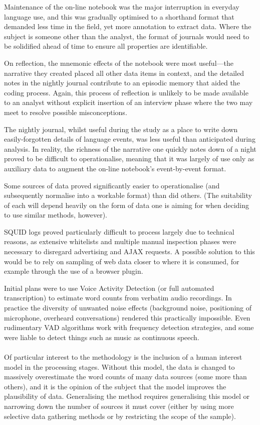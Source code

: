 Maintenance of the on-line notebook was the major interruption in everyday language use, and this was gradually optimised to a shorthand format that demanded less time in the field, yet more annotation to extract data.  Where the subject is someone other than the analyst, the format of journals would need to be solidified ahead of time to ensure all properties are identifiable.

On reflection, the mnemonic effects of the notebook were most useful---the narrative they created placed all other data items in context, and the detailed notes in the nightly journal contribute to an episodic memory that aided the coding process.  Again, this process of reflection is unlikely to be made available to an analyst without explicit insertion of an interview phase where the two may meet to resolve possible misconceptions.

The nightly journal, whilst useful during the study as a place to write down easily-forgotten details of language events, was less useful than anticipated during analysis.  In reality, the richness of the narrative one quickly notes down of a night proved to be difficult to operationalise, meaning that it was largely of use only as auxiliary data to augment the on-line notebook's event-by-event format.

Some sources of data proved significantly easier to operationalise (and subsequently normalise into a workable format) than did others.  (The suitability of each will depend heavily on the form of data one is aiming for when deciding to use similar methods, however).

SQUID logs proved particularly difficult to process largely due to technical reasons, as extensive whitelists and multiple manual inspection phases were necessary to disregard advertising and AJAX requests.  A possible solution to this would be to rely on sampling of web data closer to where it is consumed, for example through the use of a browser plugin.

Initial plans were to use Voice Activity Detection (or full automated transcription) to estimate word counts from verbatim audio recordings.  In practice the diversity of unwanted noise effects (background noise, positioning of microphone, overheard conversations) rendered this practically impossible.  Even rudimentary VAD algorithms work with frequency detection strategies, and some were liable to detect things such as music as continuous speech.  


\paragraph{}
Of particular interest to the methodology is the inclusion of a human interest model in the processing stages.  Without this model, the data is changed to massively overestimate the word counts of many data sources (some more than others), and it is the opinion of the subject that the model improves the plausibility of data.  Generalising the method requires generalising this model or narrowing down the number of sources it must cover (either by using more selective data gathering methods or by restricting the scope of the sample).  

